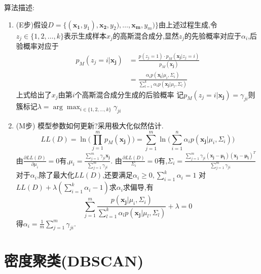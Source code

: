算法描述:
\begin{enumerate}
\item (E步)假设$D=\{(\mathbf{x_1}, y_1), \mathbf{x_2}, y_2), \dots, \mathbf{x_m}, y_m)\}$由上述过程生成,令$z_j\in\{1,2,\dots,k\}$表示生成样本$x_j$的高斯混合成分,显然$z_j$的先验概率对应于$\alpha_i$,后验概率对应于
    \begin{equation}\begin{split}
    p_M(z_j=i|\mathbf{x_j})&=\frac{p(z_j=1)\cdot p_M(\mathbf{x_j}|z_j=i)}{p_M(\mathbf{x_j})}\\&=\frac{\alpha_ip(\mathbf{x_i}|\mu_i,\Sigma_i)}{\sum_{l=1}^{k}\alpha_ip(\mathbf{x_j}|\mu_l,\Sigma_l)}
    \end{split}\end{equation}
上式给出了$x_j$由第$i$个高斯混合成分生成的后验概率
记$p_M(z_j=i|\mathbf{x_j})=\gamma_{ji}$则簇标记$\lambda=\arg\max_{i\in \{1,2,\dots,k\}}\gamma_{ji}$
\item (M步)
模型参数如何更新?采用极大化似然估计.
    \begin{equation}
    LL(D)=\ln\Big(\prod_{j=1}^mp_M(\mathbf{x_j})\Big)=\sum_{j=1}^m\ln\Big(\sum_{i=1}^n\alpha_ip(\mathbf{x_j}|\mu_i,\Sigma_i)\Big)
    \end{equation}
由$\frac{\partial LL(D)}{\partial \mu_i}=0$有,$\mu_i=\frac{\sum_{j=1}^m\gamma_{ji}\mathbf{x_j}}{\sum_{j=1}^m\gamma_{ji}}$.
由$\frac{\partial LL(D)}{\Sigma_i}=0$有,$\Sigma_i=\frac{\sum_{j=1}^m\gamma_{ji}(\mathbf{x_j-\mu_i})(\mathbf{x_j-\mu_i})^T}{\sum_{j=1}^m\gamma_{ji}}$
对于$\alpha_i$,除了最大化$LL(D)$,还要满足$\alpha_i\ge 0, \sum_{i=1}^k\alpha_i=1$
对$LL(D)+\lambda(\sum_{i=1}^k\alpha_i-1)$求$\alpha_i$求偏导,有
    \begin{equation}
    \sum_{j=1}^m\frac{p(\mathbf{x_j}|\mu_i,\Sigma_i)}{\sum_{l=1}^k\alpha_lp(\mathbf{x_j}|\mu_l,\Sigma_l)}+\lambda=0
    \end{equation}
得$\alpha_i=\frac{1}{m}\sum_{j=1}^m\gamma_{ji}$.
\end{enumerate}

\section{密度聚类(DBSCAN)}

